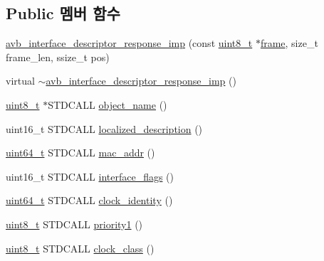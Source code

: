 \subsection*{Public 멤버 함수}
\begin{DoxyCompactItemize}
\item 
\hyperlink{classavdecc__lib_1_1avb__interface__descriptor__response__imp_a6211fb9516d177dfda9368524aaaf2a4}{avb\+\_\+interface\+\_\+descriptor\+\_\+response\+\_\+imp} (const \hyperlink{stdint_8h_aba7bc1797add20fe3efdf37ced1182c5}{uint8\+\_\+t} $\ast$\hyperlink{gst__avb__playbin_8c_ac8e710e0b5e994c0545d75d69868c6f0}{frame}, size\+\_\+t frame\+\_\+len, ssize\+\_\+t pos)
\item 
virtual \hyperlink{classavdecc__lib_1_1avb__interface__descriptor__response__imp_a84ccd601534e4a90ec709320a000b8d7}{$\sim$avb\+\_\+interface\+\_\+descriptor\+\_\+response\+\_\+imp} ()
\item 
\hyperlink{stdint_8h_aba7bc1797add20fe3efdf37ced1182c5}{uint8\+\_\+t} $\ast$S\+T\+D\+C\+A\+LL \hyperlink{classavdecc__lib_1_1avb__interface__descriptor__response__imp_a15837e3eb254ad44812cb766ae8cd53c}{object\+\_\+name} ()
\item 
uint16\+\_\+t S\+T\+D\+C\+A\+LL \hyperlink{classavdecc__lib_1_1avb__interface__descriptor__response__imp_aa94307532fbb37e2f986fee8fec79373}{localized\+\_\+description} ()
\item 
\hyperlink{parse_8c_aec6fcb673ff035718c238c8c9d544c47}{uint64\+\_\+t} S\+T\+D\+C\+A\+LL \hyperlink{classavdecc__lib_1_1avb__interface__descriptor__response__imp_aa41cab1c99d5543c3cab2d6ab5e0aa33}{mac\+\_\+addr} ()
\item 
uint16\+\_\+t S\+T\+D\+C\+A\+LL \hyperlink{classavdecc__lib_1_1avb__interface__descriptor__response__imp_adbc008dad5936a4110a92cd8f772c952}{interface\+\_\+flags} ()
\item 
\hyperlink{parse_8c_aec6fcb673ff035718c238c8c9d544c47}{uint64\+\_\+t} S\+T\+D\+C\+A\+LL \hyperlink{classavdecc__lib_1_1avb__interface__descriptor__response__imp_aa558cf7e44c868a7a97e5ca8f6a410ae}{clock\+\_\+identity} ()
\item 
\hyperlink{stdint_8h_aba7bc1797add20fe3efdf37ced1182c5}{uint8\+\_\+t} S\+T\+D\+C\+A\+LL \hyperlink{classavdecc__lib_1_1avb__interface__descriptor__response__imp_ab737b2c288b06dcf0ff27a3324384367}{priority1} ()
\item 
\hyperlink{stdint_8h_aba7bc1797add20fe3efdf37ced1182c5}{uint8\+\_\+t} S\+T\+D\+C\+A\+LL \hyperlink{classavdecc__lib_1_1avb__interface__descriptor__response__imp_a0fd7af5dcba629910442f568408b0f8f}{clock\+\_\+class} ()

\end{DoxyCompactItemize}
